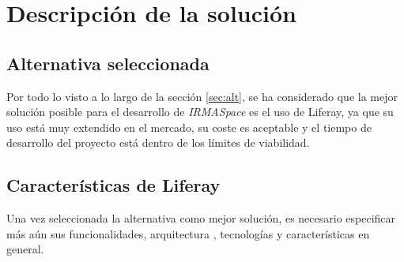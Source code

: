 \chapter{Descripción de la solución}\label{sec:solution}


\section{Alternativa seleccionada}
\par Por todo lo visto a lo largo de la sección \ref{sec:alt}, se ha considerado que la mejor solución posible para el desarrollo de \textit{IRMASpace} es el uso de Liferay, ya que su uso está muy extendido en el mercado, su coste es aceptable y el tiempo de desarrollo del proyecto está dentro de los límites de viabilidad.

\section{Características de Liferay}
\par Una vez seleccionada la alternativa como mejor solución, es necesario especificar más aún sus funcionalidades, arquitectura , tecnologías y características en general.

